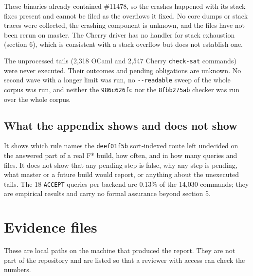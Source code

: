 \documentclass[10pt,a4paper]{article}
\begin{document}
These binaries already contained \#11478, so the crashes happened with its stack fixes present and cannot be filed as the overflows it fixed. No core dumps or stack traces were collected, the crashing component is unknown, and the files have not been rerun on master. The Cherry driver has no handler for stack exhaustion (section 6), which is consistent with a stack overflow but does not establish one.

The unprocessed tails (2,318 OCaml and 2,547 Cherry \texttt{check-{}\allowbreak{}sat} commands) were never executed. Their outcomes and pending obligations are unknown. No second wave with a longer limit was run, no \texttt{-{}\allowbreak{}-{}\allowbreak{}readable} sweep of the whole corpus was run, and neither the \texttt{986c626fc} nor the \texttt{8fbb275ab} checker was run over the whole corpus.

\subsection{What the appendix shows and does not show}\label{sec:a7-what-the-appendix-shows-and-does-not-show}

It shows which rule names the \texttt{deef01f5b} sort-indexed route left undecided on the answered part of a real F* build, how often, and in how many queries and files. It does not show that any pending step is false, why any step is pending, what master or a future build would report, or anything about the unexecuted tails. The 18 \texttt{ACCEPT} queries per backend are 0.13\% of the 14,030 commands; they are empirical results and carry no formal assurance beyond section 5.

\section{Evidence files}\label{sec:appendix-b-evidence-files}

These are local paths on the machine that produced the report. They are not part of the repository and are listed so that a reviewer with access can check the numbers.
\end{document}
